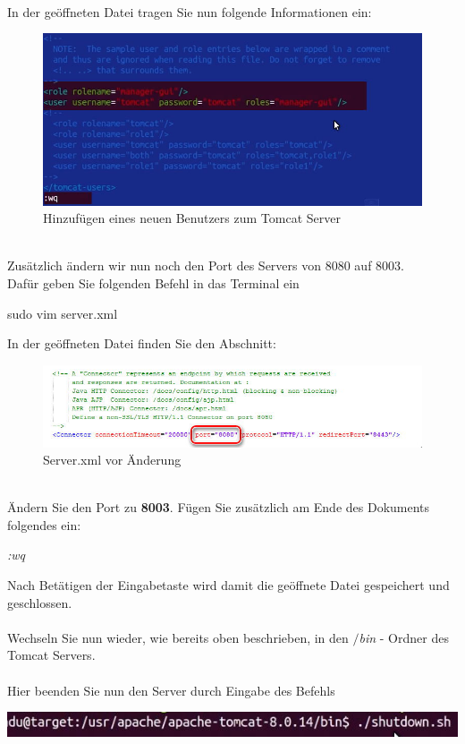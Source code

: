 \documentclass[a4paper, 12pt]{scrreprt}
\begin{document}
\newpage
\ \\
In der geöffneten Datei tragen Sie nun folgende Informationen ein:
\begin{figure}[h]
\centering
\includegraphics[width=0.7\linewidth]{Grafiken/server-user+}
\caption{Hinzufügen eines neuen Benutzers zum Tomcat Server}
\label{fig:server-user+}
\end{figure}
\ \\
Zusätzlich ändern wir nun noch den Port des Servers von 8080 auf 8003.\\
Dafür geben Sie folgenden Befehl in das Terminal ein
\begin{center}
	sudo vim server.xml
\end{center}
In der geöffneten Datei finden Sie den Abschnitt:
\begin{figure}[h]
\centering
\includegraphics[width=0.9\linewidth]{Grafiken/port8080}
\caption{Server.xml vor Änderung}
\label{fig:port8080}
\end{figure}
\ \\
Ändern Sie den Port zu \textbf{8003}. Fügen Sie zusätzlich am Ende des Dokuments folgendes ein:
\begin{center}
	{\it :wq}
\end{center}
Nach Betätigen der Eingabetaste wird damit die geöffnete Datei gespeichert und geschlossen.\ \\
\ \\
Wechseln Sie nun wieder, wie bereits oben beschrieben, in den {\it $/$bin} - Ordner des Tomcat Servers.\\
\ \\
Hier beenden Sie nun den Server durch Eingabe des Befehls 
\begin{center}
\includegraphics[width=0.8\linewidth]{Grafiken/Shutdown}
\end{center}
\end{document}
